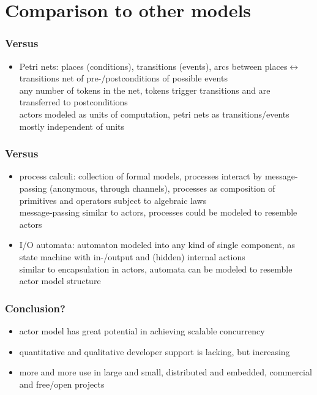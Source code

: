 \section{Comparison to other models}
\begin{frame}
\frametitle{Versus}
\begin{itemize}
\item Petri nets: places (conditions), transitions (events), arcs between places$\leftrightarrow$transitions \textrightarrow net of pre-/postconditions of possible events \\
\textrightarrow any number of tokens in the net, tokens trigger transitions and are transferred to postconditions \\
\textrightarrow actors modeled as units of computation, petri nets as transitions/events mostly independent of units
\end{itemize}
\end{frame}

\begin{frame}
\frametitle{Versus}
\begin{itemize}
\item process calculi: collection of formal models, processes interact by message-passing (anonymous, through channels), processes as composition of primitives and operators subject to algebraic laws \\
\textrightarrow message-passing similar to actors, processes could be modeled to resemble actors
\item I/O automata: automaton modeled into any kind of single component, as state machine with in-/output and (hidden) internal actions \\
\textrightarrow similar to encapsulation in actors, automata can be modeled to resemble actor model structure
\end{itemize}
\end{frame}

\begin{frame}
\frametitle{Conclusion?}
\begin{itemize}
\item actor model has great potential in achieving scalable concurrency
\item quantitative and qualitative developer support is lacking, but increasing
\item more and more use in large and small, distributed and embedded, commercial and free/open projects
\end{itemize}
\end{frame}